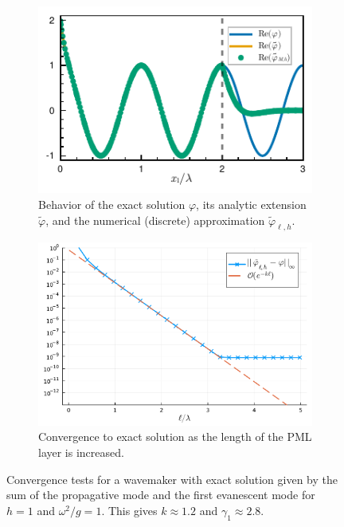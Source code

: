 \documentclass[11pt]{article}
\newcommand{\tvarphi}{\tilde \varphi}
\begin{document}
\begin{figure}
  \centering
  \begin{subfigure}{0.49\linewidth}
    \includegraphics[width=1\textwidth]{figures/wavemaker_modal_solution.pdf}
    \caption{Behavior of the exact solution $\varphi$, its analytic extension
    $\tvarphi$, and the numerical (discrete) approximation $\tvarphi_{\ell,h}$.}
  \end{subfigure}
  \begin{subfigure}{0.49\linewidth}
    \includegraphics[width=1\textwidth]{figures/convergence_pml_planewave_depth_1.pdf}
    \caption{Convergence to exact solution as the length of the PML layer is increased.}
  \end{subfigure}
  \label{fig:convergence-sourcepoint}
  \caption{Convergence tests for a wavemaker with exact solution given by the sum of the propagative mode and the first evanescent mode for $h=1$ and $\omega^2/g = 1$. This gives $k \approx 1.2$ and $\gamma_1 \approx 2.8$. }
\end{figure}
\end{document}
